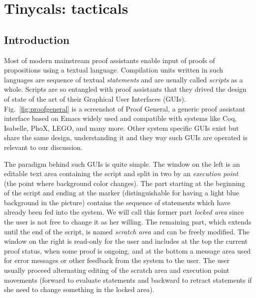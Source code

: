 
\section{Tinycals: \MATITA{} tacticals}

\subsection{Introduction}


Most of modern mainstream proof assistants enable input of proofs of
propositions using a textual language. Compilation units written in such
languages are sequence of textual \emph{statements} and are usually called
\emph{scripts} as a whole. Scripts are so entangled with proof assistants that
they drived the design of state of the art of their Graphical User Interfaces
(GUIs). Fig.~\ref{fig:proofgeneral} is a screenshot of Proof General, a generic
proof assistant interface based on Emacs widely used and compatible with systems
like Coq, Isabelle, PhoX, LEGO, and many more. Other system specific GUIs exist
but share the same design, understanding it and they way such GUIs are operated
is relevant to our discussion.



The paradigm behind such GUIs is quite simple. The window on the left is an
editable text area containing the script and split in two by an \emph{execution
point} (the point where background color changes). The part starting at the
beginning of the script and ending at the marker (distinguishable for having a
light blue background in the picture) contains the sequence of statements which
have already been fed into the system. We will call this former part
\emph{locked area} since the user is not free to change it as her willing. The
remaining part, which extends until the end of the script, is named
\emph{scratch area} and can be freely modified. The window on the right is
read-only for the user and includes at the top the current proof status, when
some proof is ongoing, and at the bottom a message area used for error messages
or other feedback from the system to the user. The user usually proceed
alternating editing of the scratch area and execution point movements (forward
to evaluate statements and backward to retract statements if she need to change
something in the locked area).

